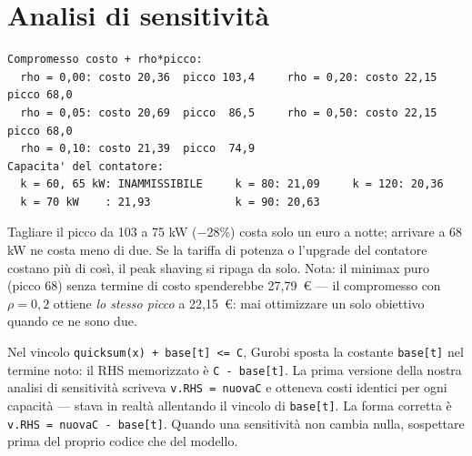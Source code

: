 \section{Analisi di sensitività}

\begin{lstlisting}[style=output]
Compromesso costo + rho*picco:
  rho = 0,00: costo 20,36  picco 103,4     rho = 0,20: costo 22,15  picco 68,0
  rho = 0,05: costo 20,69  picco  86,5     rho = 0,50: costo 22,15  picco 68,0
  rho = 0,10: costo 21,39  picco  74,9
Capacita' del contatore:
  k = 60, 65 kW: INAMMISSIBILE     k = 80: 21,09     k = 120: 20,36
  k = 70 kW    : 21,93             k = 90: 20,63
\end{lstlisting}

\begin{center}
\end{center}

\begin{insight}
Tagliare il picco da 103 a 75 kW ($-28$\%) costa solo un euro a notte; arrivare a
68 kW ne costa meno di due. Se la tariffa di potenza o l'upgrade del contatore
costano più di così, il peak shaving si ripaga da solo. Nota: il minimax puro
(picco 68) senza termine di costo spenderebbe 27,79~\euro{} --- il compromesso con
$\rho = 0{,}2$ ottiene \emph{lo stesso picco} a 22,15~\euro: mai ottimizzare un solo
obiettivo quando ce ne sono due.
\end{insight}

\begin{attenzione}
Nel vincolo \texttt{quicksum(x) + base[t] <= C}, Gurobi sposta la costante
\texttt{base[t]} nel termine noto: il RHS memorizzato è \texttt{C - base[t]}.
La prima versione della nostra analisi di sensitività scriveva
\texttt{v.RHS = nuovaC} e otteneva costi identici per ogni capacità --- stava in
realtà allentando il vincolo di \texttt{base[t]}. La forma corretta è
\texttt{v.RHS = nuovaC - base[t]}. Quando una sensitività non cambia nulla,
sospettare prima del proprio codice che del modello.
\end{attenzione}

